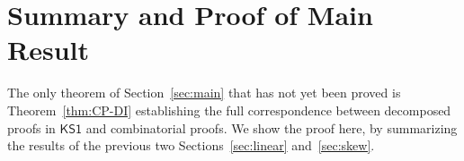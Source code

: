 \documentclass[conference,twosided,10pt]{IEEEtran}
\theoremstyle{definition}
\newcommand*{\FOKS}{\mathsf{KS1}}
\begin{document}

\section{Summary and Proof of Main Result}
\label{sec:summary}

The only theorem of Section~\ref{sec:main} that has not yet been
proved is Theorem~\ref{thm:CP-DI} establishing the full correspondence
between decomposed proofs in $\FOKS$ and combinatorial proofs. We show
the proof here, by summarizing the results of the previous two
Sections~\ref{sec:linear} and~\ref{sec:skew}.
\end{document}

